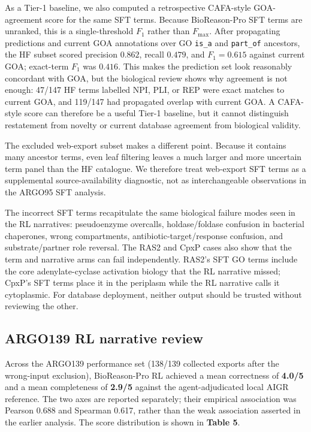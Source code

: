 \documentclass[
  11pt,
]{article}
\begin{document}
As a Tier-1 baseline, we also computed a retrospective CAFA-style
GOA-agreement score for the same SFT terms. Because BioReason-Pro SFT
terms are unranked, this is a single-threshold \(F_1\) rather than
\(F_{\max}\). After propagating predictions and current GOA annotations
over GO \texttt{is\_a} and \texttt{part\_of} ancestors, the HF subset
scored precision \(0.862\), recall \(0.479\), and \(F_1=0.615\) against
current GOA; exact-term \(F_1\) was \(0.416\). This makes the prediction
set look reasonably concordant with GOA, but the biological review shows
why agreement is not enough: 47/147 HF terms labelled NPI, PLI, or REP were
exact matches to current GOA, and 119/147 had propagated overlap with
current GOA. A CAFA-style score can therefore be a useful Tier-1
baseline, but it cannot distinguish restatement from novelty or current
database agreement from biological validity.

The excluded web-export subset makes a different point. Because it
contains many ancestor terms, even leaf filtering leaves a much larger
and more uncertain term panel than the HF catalogue. We therefore treat
web-export SFT terms as a supplemental source-availability diagnostic,
not as interchangeable observations in the ARGO95 SFT analysis.

The incorrect SFT terms recapitulate the same biological failure modes
seen in the RL narratives: pseudoenzyme overcalls, holdase/foldase
confusion in bacterial chaperones, wrong compartments,
antibiotic-target/response confusion, and substrate/partner role
reversal. The RAS2 and CpxP cases also show that the term and narrative
arms can fail independently. RAS2's SFT GO terms include the core
adenylate-cyclase activation biology that the RL narrative missed;
CpxP's SFT terms place it in the periplasm while the RL narrative calls
it cytoplasmic. For database deployment, neither output should be
trusted without reviewing the other.

\hypertarget{argo139-rl-narrative-review}{%
\subsection{ARGO139 RL narrative
review}\label{argo139-rl-narrative-review}}

Across the ARGO139 performance set (138/139 collected exports after the
wrong-input exclusion), BioReason-Pro RL achieved a mean correctness of
\textbf{4.0/5} and a mean completeness of \textbf{2.9/5} against the
agent-adjudicated local AIGR reference. The two axes are reported
separately; their empirical association was Pearson 0.688 and Spearman 0.617,
rather than the weak association asserted in the earlier analysis.
The score distribution
is shown in \textbf{Table 5}.
\end{document}
